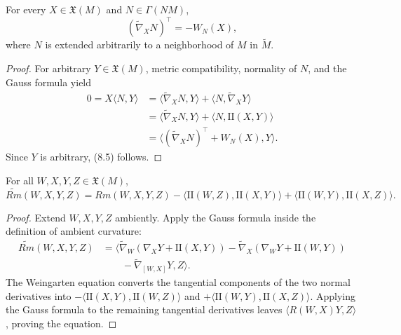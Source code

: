 \begin{proposition}
\label{prop:weingarten-equation}

For every $X\in\mathfrak X(M)$ and $N\in\Gamma(NM)$,
\begin{equation}
(\widetilde\nabla_XN)^\top=-W_N(X),
\tag{8.5}
\end{equation}
where $N$ is extended arbitrarily to a neighborhood of $M$ in
$\widetilde M$.
\end{proposition}

\begin{proof}
\sketch For arbitrary $Y\in\mathfrak X(M)$, metric compatibility, normality
of $N$, and the Gauss formula yield
\begin{align*}
0=X\langle N,Y\rangle
&=\langle\widetilde\nabla_XN,Y\rangle
 +\langle N,\widetilde\nabla_XY\rangle\\
&=\langle\widetilde\nabla_XN,Y\rangle
 +\langle N,\mathrm{II}(X,Y)\rangle\\
&=\langle(\widetilde\nabla_XN)^\top+W_N(X),Y\rangle.
\end{align*}
Since $Y$ is arbitrary, (8.5) follows.
\end{proof}

\begin{theorem}
\label{thm:gauss-equation}


For all $W,X,Y,Z\in\mathfrak X(M)$,
\[
\widetilde{Rm}(W,X,Y,Z)
=Rm(W,X,Y,Z)
-\langle\mathrm{II}(W,Z),\mathrm{II}(X,Y)\rangle
+\langle\mathrm{II}(W,Y),\mathrm{II}(X,Z)\rangle.
\]
\end{theorem}

\begin{proof}
\sketch Extend $W,X,Y,Z$ ambiently. Apply the Gauss formula inside the
definition of ambient curvature:
\begin{align*}
\widetilde{Rm}(W,X,Y,Z)
&=\big\langle
\widetilde\nabla_W(\nabla_XY+\mathrm{II}(X,Y))
-\widetilde\nabla_X(\nabla_WY+\mathrm{II}(W,Y))\\
&\qquad-\widetilde\nabla_{[W,X]}Y,Z
\big\rangle.
\end{align*}
The Weingarten equation converts the tangential components of the two normal
derivatives into
$-\langle\mathrm{II}(X,Y),\mathrm{II}(W,Z)\rangle$ and
$+\langle\mathrm{II}(W,Y),\mathrm{II}(X,Z)\rangle$. Applying the Gauss
formula to the remaining tangential derivatives leaves
$\langle R(W,X)Y,Z\rangle$, proving the equation.
\end{proof}

